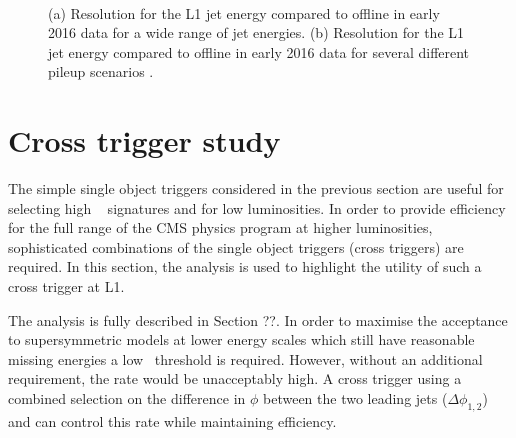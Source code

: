 \begin{figure}
\centering
	~
	\caption{(a) Resolution for the L1 jet energy compared to offline in early 2016 data for a wide
range of jet energies. (b) Resolution for the L1 jet energy compared to offline in early 2016 data for several different 
pileup scenarios \cite{l1sums_perf}.}
\label{fig:trig_2016}
\end{figure}


\section{Cross trigger study}

The simple single object triggers considered in the previous section are useful for selecting
high \pt~ signatures and for low luminosities. In order to provide efficiency for
the full range of the CMS physics program at higher luminosities, sophisticated combinations
of the single object triggers (cross triggers) are required. In this section, the \alphat 
analysis is used to highlight the utility of such a cross trigger at L1. 

The \alphat analysis is fully described in Section ??. In order to maximise the acceptance
to supersymmetric models at lower energy scales which still have reasonable missing energies
a low \scalht~threshold is required. However, without an additional requirement, the rate
would be unacceptably high. A cross trigger using a combined selection on the difference 
in $\phi$ between the two leading jets ($\Delta\phi_{1,2}$) and \scalht can control this rate while 
maintaining efficiency.


